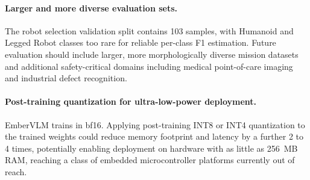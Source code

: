 \paragraph{Larger and more diverse evaluation sets.}
The robot selection validation split contains 103 samples, with Humanoid and Legged Robot classes too rare for reliable per-class F1 estimation. Future evaluation should include larger, more morphologically diverse mission datasets and additional safety-critical domains including medical point-of-care imaging and industrial defect recognition.

\paragraph{Post-training quantization for ultra-low-power deployment.}
EmberVLM trains in bf16. Applying post-training INT8 or INT4 quantization to the trained weights could reduce memory footprint and latency by a further 2 to 4 times, potentially enabling deployment on hardware with as little as 256~MB RAM, reaching a class of embedded microcontroller platforms currently out of reach.
